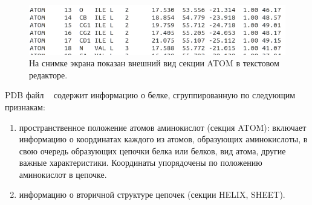 \begin{figure}
\includegraphics[width=\linewidth]{atom_in_pdb.png}
\caption{\small{На снимке экрана показан внешний вид секции ATOM в текстовом редакторе.
 }}
\label{fig:atom_in_pdb}
\end{figure}


PDB файл ~\cite{pdb} содержит информацию о белке, сгруппированную по следующим признакам: 
\begin{enumerate}
\item пространственное положение атомов аминокислот (секция ATOM):
включает информацию о координатах каждого из атомов, образующих аминокислоты, в свою очередь образующих цепочки белка или белков, вид атома, другие важные характеристики. Координаты упорядочены по положению аминокислот в цепочке.

\item информацию о вторичной структуре цепочек (секции HELIX, SHEET).
\end{enumerate}






